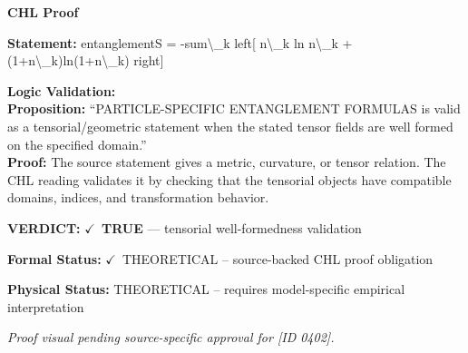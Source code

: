 \vspace{0.45em}
\noindent\textbf{CHL Proof}\par
\textbf{Statement:} entanglementS = -sum\textbackslash{}\_k left[ n\textbackslash{}\_k ln n\textbackslash{}\_k + (1+n\textbackslash{}\_k)ln(1+n\textbackslash{}\_k) right]

\textbf{Logic Validation:}\\
\textbf{Proposition:} ``PARTICLE-SPECIFIC ENTANGLEMENT FORMULAS is valid as a tensorial/geometric statement when
the stated tensor fields are well formed on the specified domain.''\\
\textbf{Proof:} The source statement gives a metric, curvature, or tensor relation. The CHL reading
validates it by checking that the tensorial objects have compatible domains, indices,
and transformation behavior.

\textbf{VERDICT:} \ensuremath{\checkmark}\ \textbf{TRUE} --- tensorial well-formedness validation

\textbf{Formal Status:} \ensuremath{\checkmark}\ THEORETICAL -- source-backed CHL proof obligation

\textbf{Physical Status:} THEORETICAL -- requires model-specific empirical interpretation
\par\vspace{0.45em}
\par
\vfill
\begingroup\footnotesize\itshape
Proof visual pending source-specific approval for [ID 0402].
\par\endgroup
\vfill
\endgroup
\endgroup
